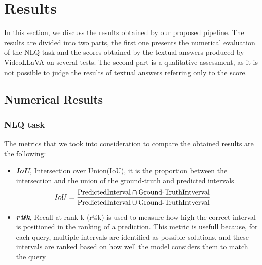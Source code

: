 \documentclass[10pt,twocolumn,letterpaper]{article}
\begin{document}
\section{Results}
In this section, we discuss the results obtained by our proposed pipeline. The results are divided into two parts, the first one presents the numerical evaluation of the NLQ task and the scores obtained by the textual answers produced by VideoLLaVA on several tests. The second part is a qualitative assessment, as it is not possible to judge the results of textual answers referring only to the score.

\subsection{Numerical Results}
\subsubsection{NLQ task}
The metrics that we took into consideration to compare the obtained results are the following:
\begin{itemize}
    \item \textit{\textbf{IoU}}, Intersection over Union(IoU), it is the proportion between the intersection and the union of the ground-truth and predicted intervals\\
    \begin{equation}
    \hspace{-0.5cm}
        IoU = \frac{\text{PredictedInterval} \cap \text{Ground-TruthIntverval}}{\text{PredictedInterval} \cup \text{Ground-TruthIntverval}}
    \end{equation}
    \item \textit{\textbf{r@k}}, Recall at rank k (r@k) is used to measure how high the correct interval is positioned in the ranking of a prediction. %
    This metric is usefull because, for each query, multiple intervals are identified as possible solutions, and these intervals are ranked based on how well the model considers them to match the query
\end{itemize}
\vspace{-0.3cm}
\end{document}
